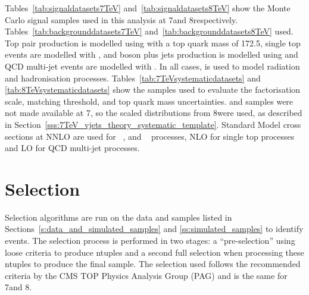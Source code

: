 Tables~\ref{tab:signaldatasets7TeV} and~\ref{tab:signaldatasets8TeV} show the Monte Carlo signal samples used
in this analysis at 7\TeV and 8\TeV respectively. Tables~\ref{tab:backgrounddatasets7TeV}
and~\ref{tab:backgrounddatasets8TeV} %
used. Top pair production is modelled using \MADGRAPH with a top quark mass of 172.5\GeV, single top events
are modelled with \POWHEG, \W and \Z boson plus jets production is modelled using \MADGRAPH and QCD multi-jet
events are modelled with \PYTHIA. In all cases, \PYTHIA is used to model radiation and hadronisation
processes. Tables~\ref{tab:7TeVsystematicdatasets} and \ref{tab:8TeVsystematicdatasets} show the samples used
to evaluate the factorisation scale, matching threshold, and top quark mass uncertainties. \WpJets and \ZpJets
samples were not made available at 7\TeV, so the scaled distributions from 8\TeV were used, as described in
Section~\ref{sss:7TeV_vjets_theory_systematic_template}. Standard Model cross sections at NNLO are used for
\ttbar~\cite{PhysRevLett.110.252004}, \W and \Z~\cite{Melnikov:2006kv} processes, NLO for single top
processes~\cite{Campbell:2009ss} and LO for QCD multi-jet processes.






\begin{landscape}


\end{landscape}

\FloatBarrier

\section{Selection}
\label{s:selection}
Selection algorithms are run on the data and samples listed in Sections~\ref{s:data_and_simulated_samples} and
\ref{ss:simulated_samples} to identify \ttbar events. The selection process is performed in two stages: a
``pre-selection'' using loose criteria to produce ntuples and a second full selection when processing these
ntuples to produce the final sample. The selection used follows the recommended criteria by the CMS TOP
Physics Analysis Group (PAG) and is the same for 7\TeV and 8\TeV.

